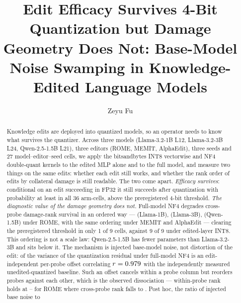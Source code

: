 \documentclass[preprint,12pt]{elsarticle}
\begin{document}
\begin{frontmatter}

\title{Edit Efficacy Survives 4-Bit Quantization but Damage Geometry Does Not:
Base-Model Noise Swamping in Knowledge-Edited Language Models}

\author{Zeyu Fu}

\begin{abstract}
Knowledge edits are deployed into quantized models, so an operator needs to know what
survives the quantizer. Across three models (Llama-3.2-1B L12, Llama-3.2-3B L24,
Qwen-2.5-1.5B L21), three editors (ROME, MEMIT, AlphaEdit), three seeds and 27
model--editor--seed cells, we apply the bitsandbytes INT8 vectorwise and NF4
double-quant kernels to the edited MLP alone and to the full model, and measure two
things on the same edits: whether each edit still works, and whether the rank order of
edits by collateral damage is still readable. The two come apart. \emph{Efficacy
survives}: conditional on an edit succeeding in FP32 it still succeeds after
quantization with probability at least \pMinCondAll{} in all 36 arm-cells, above the
preregistered \pEsrSurvFourThreshold{} 4-bit threshold. \emph{The diagnostic value of
the damage geometry does not.} Full-model NF4 degrades cross-probe damage-rank survival
in an ordered way --- \pFlatNfFMLOneRome{} (Llama-1B), \pFlatNfFMLThreeRome{}
(Llama-3B), \pFlatNfFMQOneRome{} (Qwen-1.5B) under ROME, with the same ordering under
MEMIT and AlphaEdit --- clearing the preregistered \pRankSurvFourThreshold{} threshold
in only 1 of 9 cells, against 9 of 9 under edited-layer INT8. This ordering is not a
scale law: Qwen-2.5-1.5B has fewer parameters than Llama-3.2-3B and sits below it. The
mechanism is injected base-model noise, not distortion of the edit: \pAddShareNfFM{} of
the variance of the quantization residual under full-model NF4 is an edit-independent
per-probe offset correlating $r=0.979{}$ with the independently measured
unedited-quantized baseline. Such an offset cancels within a probe column but reorders
probes against each other, which is the observed dissociation --- within-probe rank
holds at \pWithinNfFMQOneRome{}--\pWithinNfFMLOneRome{} for ROME where cross-probe rank
falls to \pFlatNfFMQOneRome{}. Post hoc, the ratio of injected base noise to

\end{abstract}
\end{frontmatter}
\end{document}
